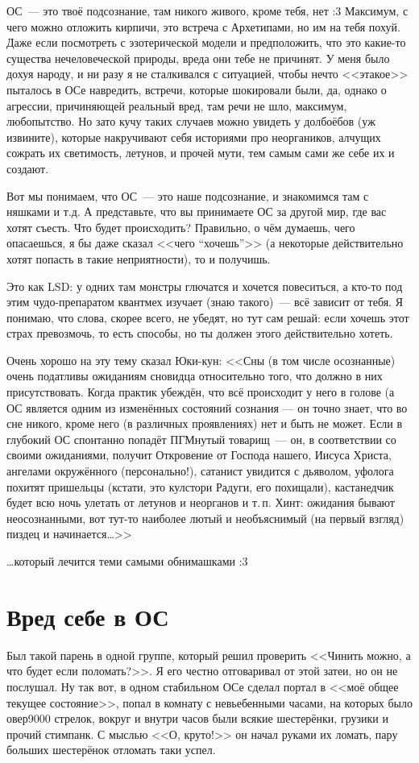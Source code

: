 \documentclass[a5paper,12pt,twoside]{memoir}
\begin{document}
\medskip
ОС~--- это твоё подсознание, там никого живого, кроме тебя, нет :3 Максимум, с чего можно отложить кирпичи, это встреча с Архетипами, но им на тебя похуй. Даже если посмотреть с эзотерической модели и предположить, что это какие-то существа нечеловеческой природы, вреда они тебе не причинят. У меня было дохуя народу, и ни разу я не сталкивался с ситуацией, чтобы нечто <<этакое>> пыталось в ОСе навредить, встречи, которые шокировали были, да, однако о агрессии, причиняющей реальный вред, там речи не шло, максимум, любопытство. Но зато кучу таких случаев можно увидеть у долбоёбов (уж извините), которые накручивают себя историями про неоргаников, алчущих сожрать их светимость, летунов, и прочей мути, тем самым сами же себе их и создают. 

Вот мы понимаем, что ОС~--- это наше подсознание, и знакомимся там с няшками и т.д. А представьте, что вы принимаете ОС за другой мир, где вас хотят съесть. Что будет происходить? Правильно, о чём думаешь, чего опасаешься, я бы даже сказал <<чего “хочешь”>> (а некоторые действительно хотят попасть в такие неприятности), то и получишь. 

Это как LSD: у одних там монстры глючатся и хочется повеситься, а кто-то под этим чудо-препаратом квантмех изучает (знаю такого)~--- всё зависит от тебя. Я понимаю, что слова, скорее всего, не убедят, но тут сам решай: если хочешь этот страх превозмочь, то есть способы, но ты должен этого действительно хотеть. 

Очень хорошо на эту тему сказал Юки-кун:
\smallskip 
<<Сны (в том числе осознанные) очень податливы ожиданиям сновидца относительно того, что должно в них присутствовать. Когда практик убеждён, что всё происходит у него в голове (а ОС является одним из изменённых состояний сознания — он точно знает, что во сне никого, кроме него (в различных проявлениях) нет и быть не может. Если в глубокий ОС спонтанно попадёт ПГМнутый товарищ~--- он, в соответствии со своими ожиданиями, получит Откровение от Господа нашего, Иисуса Христа, ангелами окружённого (персонально!), сатанист увидится с дьяволом, уфолога похитят пришельцы (кстати, это кулстори Радуги, его похищали), кастанедчик будет всю ночь улетать от летунов и неорганов и т.\,п. Хинт: ожидания бывают неосознанными, вот тут-то наиболее лютый и необъяснимый (на первый взгляд) пиздец и начинается\ldots>>

\ldots который лечится теми самыми обнимашками :3




\section{Вред себе в ОС}
Был такой парень в одной группе, который решил проверить <<Чинить можно, а что будет если поломать?>>. Я его честно отговаривал от этой затеи, но он не послушал. Ну так вот, в одном стабильном ОСе сделал портал в <<моё общее текущее состояние>>, попал в комнату с невьебенными часами, на которых было овер9000 стрелок, вокруг и внутри часов были всякие шестерёнки, грузики и прочий стимпанк. С мыслью <<О, круто!>> он начал руками их ломать, пару больших шестерёнок отломать таки успел.
 
\end{document}
